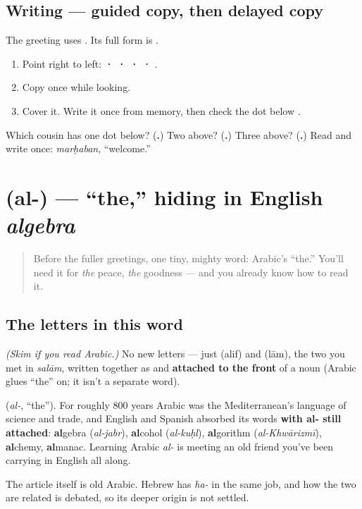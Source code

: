 \subsection*{Writing — guided copy, then delayed copy}
The greeting uses \textbf{}. Its full form is \textbf{}.

\begin{enumerate}
\raggedright
  \item Point right to left: \textbf{ ·  ·  ·  · }.
  \item Copy \textbf{} once while looking.
  \item Cover it. Write it once from memory, then check the dot below \textbf{}.
\end{enumerate}

\begin{tcolorbox}[breakable,colback=teal!4,colframe=teal!35!black,title={Before you move on}]
Which cousin has one dot below? (\textbf{.}) Two above? (\textbf{.}) Three above? (\textbf{.}) Read and write \textbf{} once: \emph{marḥaban}, “welcome.”
\end{tcolorbox}
\section[\texorpdfstring{\ar{ال} (al-)}{ال (al-)}]{ (al-) — \textquotedblleft{}the,\textquotedblright{} hiding in English \emph{algebra}}

\label{lesson:AR-C01-al}



\begin{quote}
Before the fuller greetings, one tiny, mighty word: Arabic's \textquotedblleft{}the.\textquotedblright{} You'll need it for \emph{the} peace, \emph{the} goodness — and you already know how to read it.
\end{quote}

\subsection*{The letters in this word}
\emph{(Skim if you read Arabic.)} No new letters — just \textbf{} (alif) and \textbf{} (lām), the two you met in \emph{salām}, written together as \textbf{} and \textbf{attached to the front} of a noun (Arabic glues \textquotedblleft{}the\textquotedblright{} on; it isn't a separate word).

\begin{cousinweb}
\textbf{} (\emph{al-}, \textquotedblleft{}the\textquotedblright{}). For roughly 800 years Arabic was the Mediterranean's language of science and trade, and English and Spanish absorbed its words \textbf{with al- still attached}: \textbf{al}gebra (\emph{al-jabr}), \textbf{al}cohol (\emph{al-kuḥl}), \textbf{al}gorithm (\emph{al-Khwārizmī}), \textbf{al}chemy, \textbf{al}manac. Learning Arabic \emph{al-} is meeting an old friend you've been carrying in English all along.

The article itself is old Arabic. Hebrew has \emph{ha-} in the same job, and how the two are related is debated, so its deeper origin is not settled.
\end{cousinweb}

